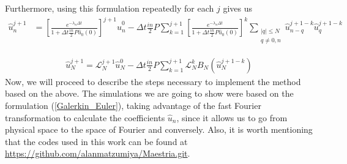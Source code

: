 		Furthermore, using this formulation repeatedly for each $j$ gives us
		\begin{align}
		\label{Galerkin_Euler}
			\hat{u}^{j+1}_n &= \left[ \frac{ e^{- \lambda_n \Delta t}}{ 1 + \Delta t \frac{in}{2} P \hat{u}_0 (0) } \right]^{j+1} \hat{u}^0_n - \Delta t \frac{in}{2} P \sum_{k=1}^{j+1} \left[ \frac{ e^{- \lambda_n \Delta t}}{ 1 + \Delta t \frac{in}{2} P \hat{u}_0 (0) } \right]^{k}  \sum_{\substack{|q|\leq N \\ q \neq 0, n}} \hat{u}^{j+1-k}_{n - q} \hat{u}^{j+1-k}_q
		\end{align}
		
		\begin{align*}
			\hat{u}^{j+1}_N = \mathcal{L}_N^{j+1} \hat{u}^{0}_N - \Delta t \frac{in}{2} P \sum_{k=1}^{j+1} \mathcal{L}_N^{k} B_N (\hat{u}_N^{j+1-k}) 
		\end{align*}
		Now, we will proceed to describe the steps necessary to implement the method based on the above. The simulations we are going to show were based on the formulation (\ref{Galerkin_Euler}), taking advantage of the fast Fourier transformation to calculate the coefficients $\hat{u}_n$, since it allows us to go from physical space to the space of Fourier and conversely. Also, it is worth mentioning that the codes used in this work can be found at \url{https://github.com/alanmatzumiya/Maestria.git}. \\ 
		

